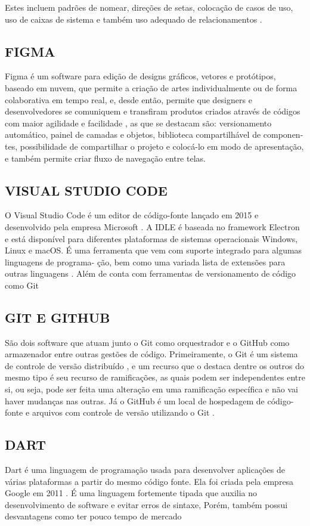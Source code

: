\documentclass[a4paper,12pt]{article}
\begin{document}
Estes incluem padrões de nomear, direções de setas, colocação de casos de uso, uso de caixas de sistema e também uso adequado de relacionamentos \cite{casodeusos}.
\subsection{FIGMA}
Figma é um software para edição de designs gráficos, vetores e protótipos, baseado em nuvem, que permite a criação de artes individualmente ou de forma colaborativa em tempo real,
e, desde então, permite que designers e desenvolvedores se comuniquem e transfiram produtos criados através de códigos com maior agilidade e facilidade \cite{figma}, as que se destacam são:
versionamento automático, painel de camadas e objetos, biblioteca compartilhável de componen-
tes, possibilidade de compartilhar o projeto e colocá-lo em modo de apresentação, e também
permite criar fluxo de navegação entre telas.
\subsection{VISUAL STUDIO CODE}
O Visual Studio Code é um editor de código-fonte lançado em 2015 e desenvolvido pela
empresa Microsoft \cite{vscode}. A IDLE é baseada no framework Electron e está disponível para diferentes
plataformas de sistemas operacionais Windows, Linux e macOS.
É uma ferramenta que vem com suporte integrado para algumas linguagens de programa-
ção, bem como uma variada lista de extensões para outras linguagens \cite{vscode}. Além de conta com ferramentas de versionamento de código como Git
\subsection{GIT E GITHUB}
São dois software que atuam junto o Git como orquestrador e o GitHub como armazenador entre outras gestões de código. Primeiramente, o Git é um
sistema de controle de versão distribuído \cite{git}, e um recurso que o destaca dentre os outros do
mesmo tipo é seu recurso de ramificações, as quais podem ser independentes entre si, ou seja,
pode ser feita uma alteração em uma ramificação específica e não vai haver mudanças nas outras.
Já o GitHub é um local de hospedagem de código-fonte e arquivos com controle de
versão utilizando o Git \cite{github}.
\subsection{DART}
Dart é uma linguagem de programação usada para desenvolver aplicações de várias plataformas a partir do mesmo código fonte. Ela foi criada pela empresa Google em 2011 \cite{dart}.
É uma linguagem fortemente tipada que auxilia no desenvolvimento de software e evitar erros de sintaxe,
Porém, também possui desvantagens como ter pouco tempo de mercado
\end{document}
